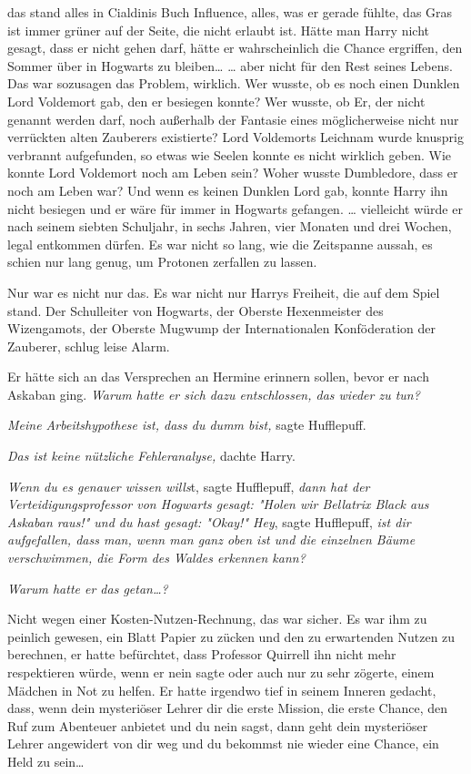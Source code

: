 {das stand alles in Cialdinis Buch Influence, alles, was er gerade fühlte, das Gras ist immer grüner auf der Seite, die nicht erlaubt ist. Hätte man Harry nicht gesagt, dass er nicht gehen darf, hätte er wahrscheinlich die Chance ergriffen, den Sommer über in Hogwarts zu bleiben… … aber nicht für den Rest seines Lebens. Das war sozusagen das Problem, wirklich. Wer wusste, ob es noch einen Dunklen Lord Voldemort gab, den er besiegen konnte? Wer wusste, ob Er, der nicht genannt werden darf, noch außerhalb der Fantasie eines möglicherweise nicht nur verrückten alten Zauberers existierte? Lord Voldemorts Leichnam wurde knusprig verbrannt aufgefunden, so etwas wie Seelen konnte es nicht wirklich geben. Wie konnte Lord Voldemort noch am Leben sein? Woher wusste Dumbledore, dass er noch am Leben war? Und wenn es keinen Dunklen Lord gab, konnte Harry ihn nicht besiegen und er wäre für immer in Hogwarts gefangen. … vielleicht würde er nach seinem siebten Schuljahr, in sechs Jahren, vier Monaten und drei Wochen, legal entkommen dürfen. Es war nicht so lang, wie die Zeitspanne aussah, es schien nur lang genug, um Protonen zerfallen zu lassen.

Nur war es nicht nur das. Es war nicht nur Harrys Freiheit, die auf dem Spiel stand. Der Schulleiter von Hogwarts, der Oberste Hexenmeister des Wizengamots, der Oberste Mugwump der Internationalen Konföderation der Zauberer, schlug leise Alarm.

Er hätte sich an das Versprechen an Hermine erinnern sollen, bevor er nach Askaban ging. \emph{Warum hatte er sich dazu entschlossen, das wieder zu tun?}

\emph{Meine Arbeitshypothese ist, dass du dumm bist,} sagte Hufflepuff.

\emph{Das ist keine nützliche Fehleranalyse,} dachte Harry.

\emph{Wenn du es genauer wissen wills}t, sagte Hufflepuff, \emph{dann hat der Verteidigungsprofessor von Hogwarts gesagt: "Holen wir Bellatrix Black aus Askaban raus!" und du hast gesagt: "Okay!" Hey}, sagte Hufflepuff, \emph{ist dir aufgefallen, dass man, wenn man ganz oben ist und die einzelnen Bäume verschwimmen, die Form des Waldes erkennen kann?}

\emph{Warum hatte er das getan…?}

Nicht wegen einer Kosten-Nutzen-Rechnung, das war sicher. Es war ihm zu peinlich gewesen, ein Blatt Papier zu zücken und den zu erwartenden Nutzen zu berechnen, er hatte befürchtet, dass Professor Quirrell ihn nicht mehr respektieren würde, wenn er nein sagte oder auch nur zu sehr zögerte, einem Mädchen in Not zu helfen. Er hatte irgendwo tief in seinem Inneren gedacht, dass, wenn dein mysteriöser Lehrer dir die erste Mission, die erste Chance, den Ruf zum Abenteuer anbietet und du nein sagst, dann geht dein mysteriöser Lehrer angewidert von dir weg und du bekommst nie wieder eine Chance, ein Held zu sein…

}
